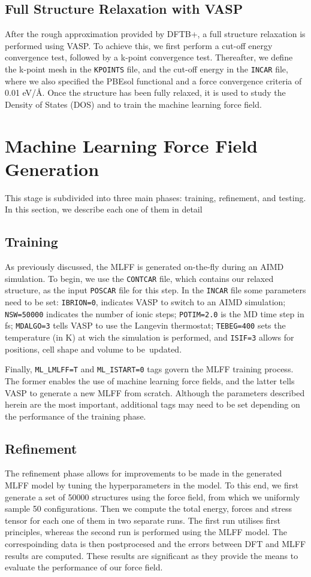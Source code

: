 \subsection{Full Structure Relaxation with VASP}
After the rough approximation provided by DFTB+, a full structure relaxation is performed using VASP. To achieve this, we first perform a cut-off energy convergence test, followed by a k-point convergence test. Thereafter, we define the k-point mesh in the \texttt{KPOINTS} file, and the cut-off energy in the \texttt{INCAR} file, where we also specified the PBEsol functional and a force convergence criteria of 0.01 eV/\AA. Once the structure has been fully relaxed, it is used to study the Density of States (DOS) and to train the machine learning force field.

\section{Machine Learning Force Field Generation}
This stage is subdivided into three main phases: training, refinement, and testing. In this section, we describe each one of them in detail 
\subsection{Training}
As previously discussed, the MLFF is generated on-the-fly during an AIMD simulation. To begin, we use the \texttt{CONTCAR} file, which contains our relaxed structure, as the input \texttt{POSCAR} file for this step. In the \texttt{INCAR} file some parameters need to be set: \texttt{IBRION=0}, indicates VASP to switch to an AIMD simulation; \texttt{NSW=50000} indicates the number of ionic steps; \texttt{POTIM=2.0} is the MD time step in fs; \texttt{MDALGO=3} tells VASP to use the Langevin thermostat; \texttt{TEBEG=400} sets the temperature (in K) at wich the simulation is performed, and \texttt{ISIF=3} allows for positions, cell shape and volume to be~updated. 

Finally, \texttt{ML\_LMLFF=T} and \texttt{ML\_ISTART=0} tags govern the MLFF training process. The former enables the use of machine learning force fields, and the latter tells VASP to generate a new MLFF from scratch. Although the parameters described herein are the most important, additional tags may need to be set depending on the performance of the training phase.

\subsection{Refinement}
The refinement phase allows for improvements to be made in the generated MLFF model by tuning the hyperparameters in the model. To this end, we first generate a set of 50000 structures using the force field, from which we uniformly sample 50 configurations. Then we compute the total energy, forces and stress tensor for each one of them in two separate runs. The first run utilises first principles, whereas the second run is performed using the MLFF model. The correspoinding data is then postprocesed and the errors between DFT and MLFF results are computed. These results are significant as they provide the means to evaluate the performance of our force field. 

